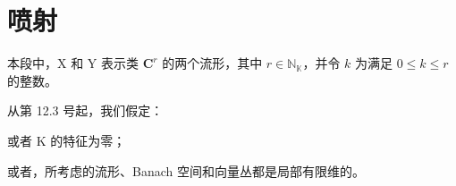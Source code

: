 \section{喷射}

本段中，X 和 Y 表示类 \(\mathbf{C}^r\) 的两个流形，其中 \(r \in \mathbb{N}_{\mathbb{K}}\)，并令 \(k\) 为满足 \(0 \leqslant k \leqslant r\) 的整数。

从第 12.3 号起，我们假定：

或者 K 的特征为零；

或者，所考虑的流形、Banach 空间和向量丛都是局部有限维的。

